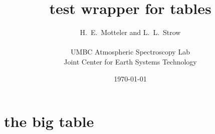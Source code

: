 \documentclass[10pt]{article}
\title{test wrapper for tables}
\author{H.~E.~Motteler and L.~L.~Strow \\
  \\
  UMBC Atmospheric Spectroscopy Lab \\
  Joint Center for Earth Systems Technology \\
}
\date{\today}
\begin{document}
\maketitle

\section{the big table}


\end{document}
